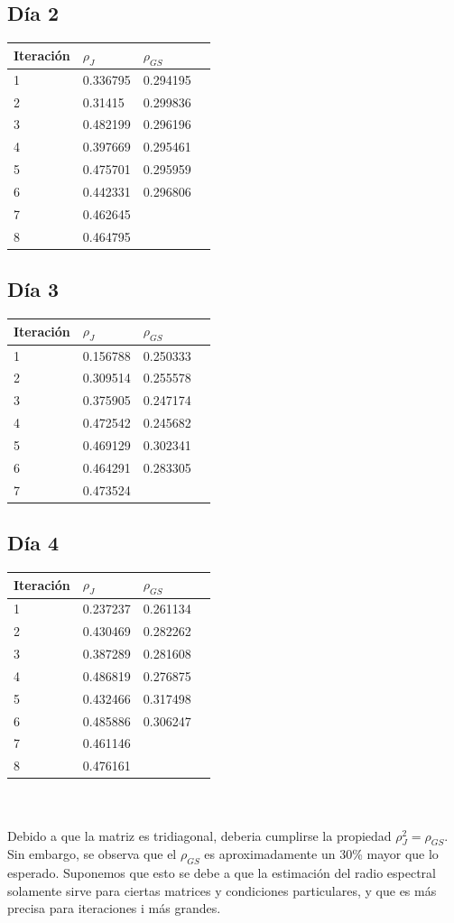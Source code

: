 \documentclass[12pt,spanish]{article}
\begin{document}
\subsection*{Día 2}
    \begin{tabular}{| l | l | l | l |}
    \hline
    Iteración & $\rho_J$ & $\rho_{GS}$ \\ \hline
1 & 0.336795 & 0.294195 \\
2 & 0.31415 & 0.299836 \\
3 & 0.482199 & 0.296196 \\
4 & 0.397669 & 0.295461 \\
5 & 0.475701 & 0.295959 \\
6 & 0.442331 & 0.296806 \\
7 & 0.462645 &  \\
8 & 0.464795 & \\ 
    \hline
    \end{tabular}

\subsection*{Día 3}
    \begin{tabular}{| l | l | l | l |}
    \hline
    Iteración & $\rho_J$ & $\rho_{GS}$ \\ \hline
1 & 0.156788 & 0.250333 \\
2 & 0.309514 & 0.255578 \\
3 & 0.375905 & 0.247174 \\
4 & 0.472542 & 0.245682 \\
5 & 0.469129 & 0.302341 \\
6 & 0.464291 & 0.283305 \\
7 & 0.473524 &  \\
    \hline
    \end{tabular}

\subsection*{Día 4}
    \begin{tabular}{| l | l | l | l |}
    \hline
    Iteración & $\rho_J$ & $\rho_{GS}$ \\ \hline
1 & 0.237237 & 0.261134 \\
2 & 0.430469 & 0.282262 \\
3 & 0.387289 & 0.281608 \\
4 & 0.486819 & 0.276875 \\
5 & 0.432466 & 0.317498 \\
6 & 0.485886 & 0.306247 \\
7 & 0.461146 &  \\
8 & 0.476161 &  \\
    \hline
    \end{tabular}
\\
\\
Debido a que la matriz es tridiagonal, deberia cumplirse la propiedad  $\rho_J ^2 = \rho_{GS}$. Sin embargo, se observa que el $\rho_{GS}$ es aproximadamente un 30\% mayor que lo esperado. Suponemos que esto se debe a que la estimación del radio espectral solamente sirve para ciertas matrices y condiciones particulares, y que es más precisa para iteraciones i más grandes.
\end{document}
